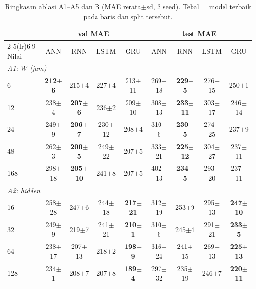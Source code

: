 \begin{table}[t]
\centering
\scriptsize
\caption{Ringkasan ablasi A1--A5 dan B (MAE rerata$\pm$sd, 3 seed). Tebal = model terbaik pada baris dan split tersebut.}
\label{tab:AB}
\setlength{\tabcolsep}{3.5pt}
\begin{tabular}{@{}lcccccccc@{}}
\toprule
 & \multicolumn{4}{c}{val MAE} & \multicolumn{4}{c}{test MAE} \\
\cmidrule(lr){2-5}\cmidrule(lr){6-9}
Nilai & ANN & RNN & LSTM & GRU & ANN & RNN & LSTM & GRU \\
\midrule
\multicolumn{9}{l}{\textit{A1: $W$ (jam)}} \\
\hspace{4pt}6 & \textbf{212$\pm$6} & 215$\pm$4 & 227$\pm$4 & 213$\pm$11 & 269$\pm$18 & \textbf{229$\pm$5} & 276$\pm$15 & 250$\pm$1 \\
\hspace{4pt}12 & 238$\pm$4 & \textbf{207$\pm$6} & 236$\pm$2 & 209$\pm$10 & 308$\pm$13 & \textbf{233$\pm$11} & 303$\pm$17 & 246$\pm$14 \\
\hspace{4pt}24 & 249$\pm$9 & \textbf{206$\pm$7} & 230$\pm$12 & 208$\pm$4 & 310$\pm$6 & \textbf{230$\pm$5} & 274$\pm$25 & 237$\pm$9 \\
\hspace{4pt}48 & 262$\pm$3 & \textbf{200$\pm$5} & 249$\pm$22 & 207$\pm$5 & 333$\pm$21 & \textbf{225$\pm$12} & 304$\pm$27 & 237$\pm$11 \\
\hspace{4pt}168 & 298$\pm$18 & \textbf{205$\pm$10} & 241$\pm$8 & 207$\pm$5 & 402$\pm$13 & \textbf{234$\pm$5} & 293$\pm$20 & 237$\pm$11 \\
\midrule
\multicolumn{9}{l}{\textit{A2: hidden}} \\
\hspace{4pt}16 & 258$\pm$28 & 247$\pm$6 & 244$\pm$18 & \textbf{217$\pm$21} & 312$\pm$19 & 253$\pm$9 & 295$\pm$13 & \textbf{247$\pm$10} \\
\hspace{4pt}32 & 249$\pm$9 & 219$\pm$7 & 241$\pm$21 & \textbf{210$\pm$1} & 310$\pm$6 & 245$\pm$4 & 291$\pm$21 & \textbf{233$\pm$5} \\
\hspace{4pt}64 & 238$\pm$17 & 207$\pm$13 & 218$\pm$2 & \textbf{198$\pm$9} & 316$\pm$24 & 241$\pm$15 & 269$\pm$13 & \textbf{225$\pm$13} \\
\hspace{4pt}128 & 234$\pm$1 & 208$\pm$7 & 207$\pm$8 & \textbf{189$\pm$4} & 297$\pm$32 & 235$\pm$19 & 246$\pm$7 & \textbf{220$\pm$11} \\

\end{tabular}
\end{table}

